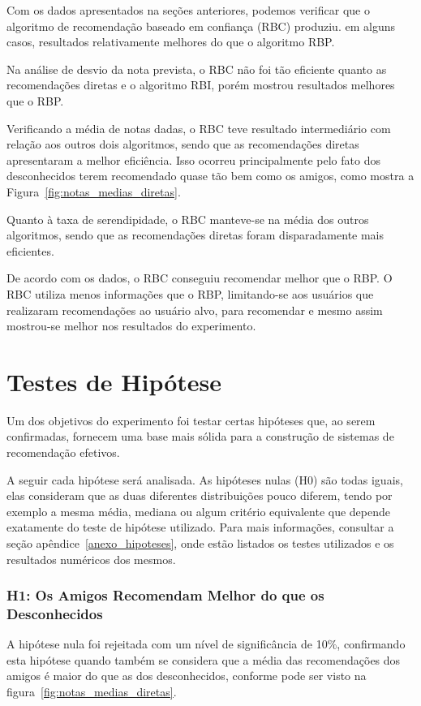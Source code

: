  Com os dados apresentados na seções anteriores, podemos verificar que o algoritmo de recomendação baseado em confiança (RBC) produziu. em alguns casos, resultados relativamente melhores do que o algoritmo RBP.
 
 Na análise de desvio da nota prevista, o RBC não foi tão eficiente quanto as recomendações diretas e o algoritmo RBI, porém mostrou resultados melhores que o RBP. 
 
 Verificando a média de notas dadas, o RBC teve resultado intermediário com relação aos outros dois algoritmos, sendo que as recomendações diretas apresentaram a melhor eficiência. Isso ocorreu principalmente pelo fato dos desconhecidos terem recomendado quase tão bem como os amigos, como mostra a Figura~\ref{fig:notas_medias_diretas}.
 
 Quanto à taxa de serendipidade, o RBC manteve-se na média dos outros algoritmos, sendo que as recomendações diretas foram disparadamente mais eficientes.
 
 De acordo com os dados, o RBC conseguiu recomendar melhor que o RBP. O RBC utiliza menos informações que o RBP, limitando-se aos usuários que realizaram recomendações ao usuário alvo, para recomendar e mesmo assim mostrou-se melhor nos resultados do experimento.


\section{Testes de Hipótese}

Um dos objetivos do experimento foi testar certas hipóteses que, ao serem confirmadas, fornecem uma base mais sólida para a construção de sistemas de recomendação efetivos.

A seguir cada hipótese será analisada. As hipóteses nulas (H0) são todas iguais, elas consideram que as duas diferentes distribuições pouco diferem, tendo por exemplo a mesma média, mediana ou algum critério equivalente que depende exatamente do teste de hipótese utilizado. Para mais informações, consultar a seção apêndice~\ref{anexo_hipoteses}, onde estão listados os testes utilizados e os resultados numéricos dos mesmos.

\subsubsection{H1: Os Amigos Recomendam Melhor do que os Desconhecidos}
A hipótese nula foi rejeitada com um nível de significância de 10\%, confirmando esta hipótese quando também se considera que a média das recomendações dos amigos é maior do que as dos desconhecidos, conforme pode ser visto na figura~\ref{fig:notas_medias_diretas}.


